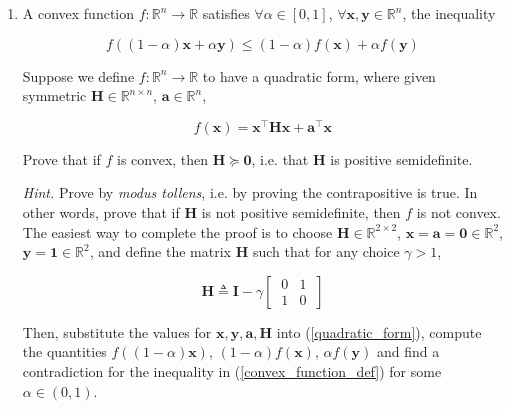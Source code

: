 \documentclass{article}
\numberwithin{equation}{section}
\begin{document}
\begin{enumerate}
    \item
    A convex function $ f : \mathbb{R}^n \rightarrow \mathbb{R} $ satisfies
    $ \forall \alpha \in [0, 1] $, $ \forall \mathbf{x}, \mathbf{y} \in
    \mathbb{R}^n $, the inequality

    \begin{equation} \label{convex_function_def}
        f((1 - \alpha)\mathbf{x} + \alpha\mathbf{y}) \le
        (1 - \alpha)f(\mathbf{x}) + \alpha f(\mathbf{y})
    \end{equation}
    
    Suppose we define $ f : \mathbb{R}^n \rightarrow
    \mathbb{R} $ to have a quadratic form, where given symmetric
    $ \mathbf{H} \in \mathbb{R}^{n \times n} $, $ \mathbf{a} \in \mathbb{R}^n $,

    \begin{equation} \label{quadratic_form}
        f(\mathbf{x}) = \mathbf{x}^\top\mathbf{Hx} + \mathbf{a}^\top\mathbf{x}
    \end{equation}

    Prove that if $ f $ is convex, then $ \mathbf{H} \succeq \mathbf{0} $, i.e.
    that $ \mathbf{H} $ is positive semidefinite.

    \medskip

    \textit{Hint.} Prove by \textit{modus tollens}, i.e. by proving the
    contrapositive is true. In other words, prove that if $ \mathbf{H} $ is not
    positive semidefinite, then $ f $ is not convex. The easiest way to complete
    the proof is to choose $ \mathbf{H} \in \mathbb{R}^{2 \times 2} $,
    $ \mathbf{x} = \mathbf{a} = \mathbf{0} \in \mathbb{R}^2 $, $ \mathbf{y} =
    \mathbf{1} \in \mathbb{R}^2 $, and define the matrix $ \mathbf{H} $ such
    that for any choice $ \gamma > 1 $,

    \begin{equation*}
        \mathbf{H} \triangleq \mathbf{I} -
        \gamma\begin{bmatrix} \ 0 & 1 \ \\ \ 1 & 0 \ \end{bmatrix}
    \end{equation*}

    Then, substitute the values for $ \mathbf{x}, \mathbf{y}, \mathbf{a},
    \mathbf{H} $ into (\ref{quadratic_form}), compute the quantities
    $ f((1 - \alpha)\mathbf{x}) $, $ (1 - \alpha)f(\mathbf{x}) $,
    $ \alpha f(\mathbf{y}) $ and find a contradiction for the inequality in
    (\ref{convex_function_def}) for some $ \alpha \in  (0, 1) $.
\end{enumerate}
\end{document}
